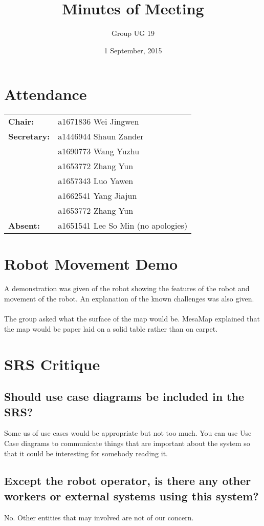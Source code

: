 \documentclass[a4paper]{article}
\title{Minutes of Meeting}
\author{Group UG 19}
\date{1 September, 2015}
\begin{document}
\maketitle
\section*{Attendance}
\begin{tabular}{l l}
\textbf{Chair:} 
&a1671836 Wei Jingwen\\
\textbf{Secretary:}&a1446944 Shaun Zander\\
&a1690773 Wang Yuzhu\\
&a1653772 Zhang Yun\\
&a1657343 Luo Yawen\\
&a1662541 Yang Jiajun\\
&a1653772 Zhang Yun\\
\textbf{Absent:}&a1651541 Lee So Min (no apologies)
\end{tabular}

\section{Robot Movement Demo}
A demonstration was given of the robot showing the features of the robot and movement of the robot. An explanation of the known challenges was also given.\\
\\
The group asked what the surface of the map would be. MesaMap explained that the map would be paper laid on a solid table rather than on carpet.

\section{SRS Critique}
\subsection{Should use case diagrams be included in the SRS?}
Some us of use cases would be appropriate but not too much. You can use Use Case diagrams to communicate things that are important about the system so that it could be interesting for somebody reading it.

\subsection{Except the robot operator, is there any other workers or external systems using this system?}
No. Other entities that may involved are not of our concern.
\end{document}
